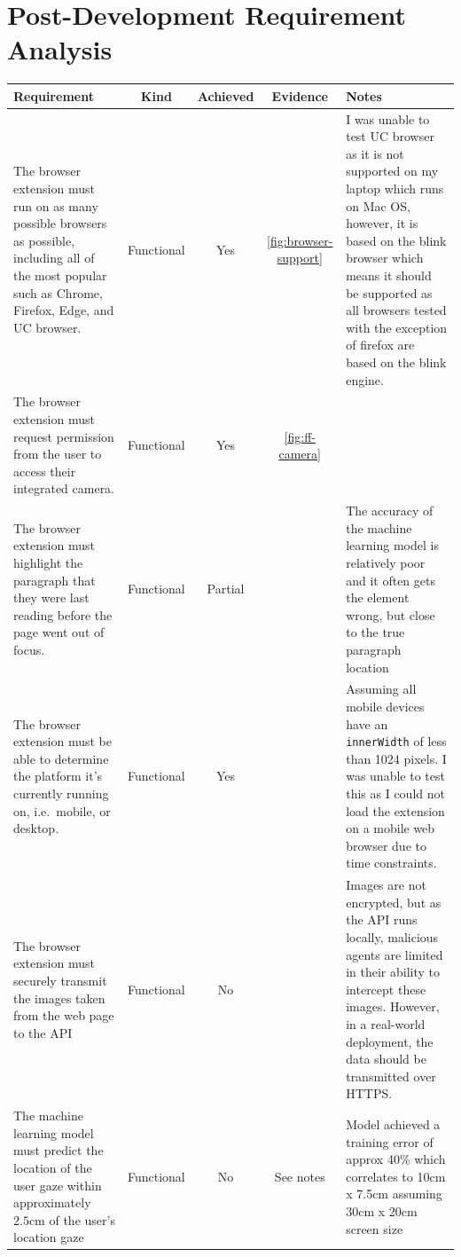 \documentclass{report}
\begin{document}
\section{Post-Development Requirement Analysis}
\label{sec:post-devel-requirement-analysis}

\begin{center}
\begin{tabularx}{\textwidth}{|X|c|c|c|X|}
    \caption{Analysis of Requirements Compliance Table} \\ 
    \hline
    \textbf{Requirement} & \textbf{Kind} & \textbf{Achieved} & \textbf{Evidence} & \textbf{Notes} \\ 
    \hline

    The browser extension must run on as many possible browsers as possible, including all of the most popular such as Chrome, Firefox, Edge, and UC browser. & Functional & Yes & \autoref{fig:browser-support} & I was unable to test UC browser as it is not supported on my laptop which runs on Mac OS, however, it is based on the blink browser which means it should be supported as all browsers tested with the exception of firefox are based on the blink engine.  \\
    \hline
    The browser extension must request permission from the user to access their integrated camera. & Functional & Yes & \autoref{fig:ff-camera} & \\
    \hline
    The browser extension must highlight the paragraph that they were last reading before the page went out of focus.  & Functional & Partial & \cite{demonstrationVideo} & The accuracy of the machine learning model is relatively poor and it often gets the element wrong, but close to the true paragraph location \\
    \hline
    The browser extension must be able to determine the platform it's currently running on, i.e.~mobile, or desktop. & Functional & Yes & ~ & Assuming all mobile devices have an \texttt{innerWidth} of less than 1024 pixels. I was unable to test this as I could not load the extension on a mobile web browser due to time constraints. \\
    \hline
    The browser extension must securely transmit the images taken from the web page to the API & Functional & No & ~ & Images are not encrypted, but as the API runs locally, malicious agents are limited in their ability to intercept these images. However, in a real-world deployment, the data should be transmitted over HTTPS. \\
    \hline
    The machine learning model must predict the location of the user gaze within approximately \(2.5\text{cm}\) of the user's location gaze  & Functional & No & See notes & Model achieved a training error of approx 40\% which correlates to 10cm x 7.5cm assuming 30cm x 20cm screen size \\

\end{tabularx}
\end{center}
\end{document}
